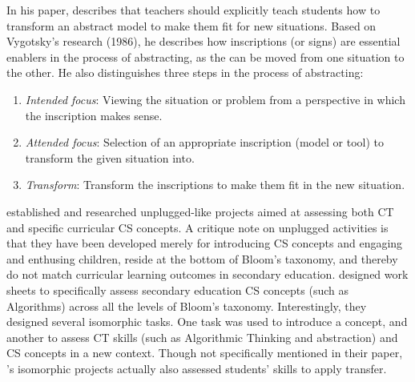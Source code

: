 In his paper,  describes that teachers should explicitly teach students how to transform an abstract model to make them fit for new situations. Based on Vygotsky's research (1986), he describes how inscriptions (or signs) are essential enablers in the process of abstracting, as the can be moved from one situation to the other. He also distinguishes three steps in the process of abstracting:
\begin{enumerate}
\item \textit{Intended focus}: Viewing the situation or problem from a perspective in which the inscription makes sense.

\item \textit{Attended focus}: Selection of an appropriate inscription (model or tool) to transform the given situation into.

\item \textit{Transform}: Transform the inscriptions to make them fit in the new situation.
\end{enumerate}


 established and researched unplugged-like projects aimed at assessing both CT and specific curricular CS concepts. A critique note on unplugged activities is that they have been developed merely for introducing CS concepts and engaging and enthusing children, reside at the bottom of Bloom's taxonomy, and thereby do not match curricular learning outcomes in secondary education\cite{thies2012unpluggedLearningObjectives}. \citeauthor{rodriguez2017assessingCTunplugged} designed work sheets to specifically assess secondary education CS concepts (such as Algorithms) across all the levels of Bloom's taxonomy. Interestingly, they designed several isomorphic tasks. One task was used to introduce a concept, and another to assess CT skills (such as Algorithmic Thinking and abstraction) and CS concepts in a new context. Though not specifically mentioned in their paper, \citeauthor{rodriguez2017assessingCTunplugged}'s isomorphic projects actually also assessed students' skills to apply transfer.

